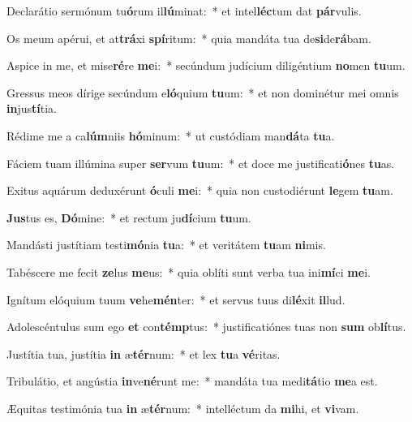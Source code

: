 \item Declarátio sermónum tu\textbf{ó}rum il\textbf{lú}minat:~* et intel\textbf{léc}tum dat \textbf{pár}vulis.
\item Os meum apérui, et at\textbf{trá}xi \textbf{spí}ritum:~* quia mandáta tua de\textbf{si}de\textbf{rá}bam.
\item Aspice in me, et mise\textbf{ré}re \textbf{me}i:~* secúndum judícium diligéntium \textbf{no}men \textbf{tu}um.
\item Gressus meos dírige secúndum e\textbf{ló}quium \textbf{tu}um:~* et non dominétur mei omnis \textbf{in}jus\textbf{tí}tia.
\item Rédime me a ca\textbf{lúm}niis \textbf{hó}minum:~* ut custódiam man\textbf{dá}ta \textbf{tu}a.
\item Fáciem tuam illúmina super \textbf{ser}vum \textbf{tu}um:~* et doce me justificati\textbf{ó}nes \textbf{tu}as.
\item Exitus aquárum deduxérunt \textbf{ó}culi \textbf{me}i:~* quia non custodiérunt \textbf{le}gem \textbf{tu}am.
\item \textbf{Jus}tus es, \textbf{Dó}mine:~* et rectum ju\textbf{dí}cium \textbf{tu}um.
\item Mandásti justítiam testi\textbf{mó}nia \textbf{tu}a:~* et veritátem \textbf{tu}am \textbf{ni}mis.
\item Tabéscere me fecit \textbf{ze}lus \textbf{me}us:~* quia oblíti sunt verba tua ini\textbf{mí}ci \textbf{me}i.
\item Ignítum elóquium tuum \textbf{ve}he\textbf{mén}ter:~* et servus tuus di\textbf{lé}xit \textbf{il}lud.
\item Adolescéntulus sum ego \textbf{et} con\textbf{témp}tus:~* justificatiónes tuas non \textbf{sum} ob\textbf{lí}tus.
\item Justítia tua, justítia \textbf{in} æ\textbf{tér}num:~* et lex \textbf{tu}a \textbf{vé}ritas.
\item Tribulátio, et angústia \textbf{in}ve\textbf{né}runt me:~* mandáta tua medi\textbf{tá}tio \textbf{me}a est.
\item Æquitas testimónia tua \textbf{in} æ\textbf{tér}num:~* intelléctum da \textbf{mi}hi, et \textbf{vi}vam.
